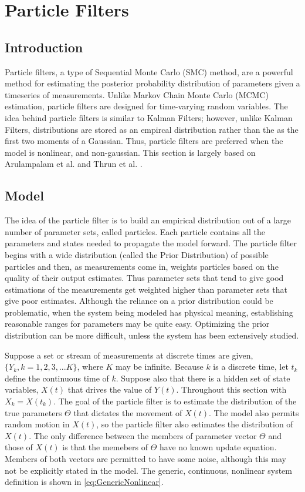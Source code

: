 \chapter{Particle Filters}
\label{sec:Particle Filter}
\section{Introduction}
Particle filters, a type of Sequential Monte Carlo (SMC) method,
are a powerful method for estimating the posterior probability distribution
 of parameters given a timeseries of measurements. Unlike Markov 
Chain Monte Carlo (MCMC) estimation, particle filters are designed for 
time-varying random variables. The idea behind particle filters is
similar to Kalman Filters; however, unlike Kalman Filters,
distributions are stored as an empircal distribution rather than the
as the first two moments of a Gaussian. Thus, particle filters are 
preferred when the model is nonlinear, and non-gaussian. This section
is largely based on Arulampalam et al. and Thrun et al. \cite{Arulampalam2002a, Thrun2005}.

\section{Model}
\label{sec:Particle Filter Model}
The idea of the particle filter is to build an empirical distribution
out of a large number of parameter sets, called particles. Each
particle contains all the parameters and states needed to propagate
the model forward.  The particle filter begins with a wide distribution 
(called the Prior Distribution)
of possible particles and then, as measurements come in, weights 
particles based on the quality of their output estimates. Thus parameter sets 
that tend to give good estimations of the measurements get weighted higher
than parameter sets that give poor estimates. Although the reliance on
a prior distribution could be problematic, when the system being modeled
has physical meaning, establishing reasonable ranges for parameters may be 
quite easy. Optimizing the prior distribution can be more difficult,
unless the system has been extensively studied.

Suppose a set or stream of measurements at discrete times are given, 
$\{Y_k, k = 1, 2, 3, ... K\}$, where $K$ may be infinite. 
Because $k$ is a discrete time, let $t_k$ define the continuous
time of $k$.
Suppose also that there is a hidden set of state variables,
$X(t)$ that drives the value of $Y(t)$. Throughout this section
with $X_k = X(t_k)$. The goal of the particle filter is to estimate the 
distribution of the
true parameters $\Theta$ that dictates the movement of $X(t)$.
The model also permits random motion in $X(t)$, so the 
particle filter also estimates the distribution of $X(t)$.
The only difference between the members of parameter vector
$\Theta$ and those of $X(t)$ is that the memebers of
$\Theta$ have no known update equation. Members of both vectors
are permitted to have some noise, although this
may not be explicitly stated in the model. The generic, continuous, nonlinear
system definition is shown in \autoref{eq:GenericNonlinear}.

